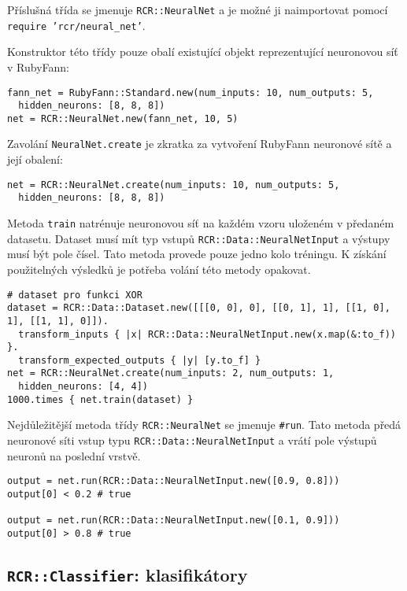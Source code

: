 \documentclass[a4paper]{article}
\begin{document}
Příslušná třída se jmenuje \texttt{RCR::NeuralNet} a je možné ji naimportovat
pomocí \texttt{require 'rcr/neural\_net'}.

Konstruktor této třídy pouze obalí existující objekt reprezentující neuronovou
síť v RubyFann:
\begin{lstlisting}
fann_net = RubyFann::Standard.new(num_inputs: 10, num_outputs: 5,
  hidden_neurons: [8, 8, 8])
net = RCR::NeuralNet.new(fann_net, 10, 5)
\end{lstlisting}

Zavolání \texttt{NeuralNet.create} je zkratka za vytvoření RubyFann neuronové
sítě a její obalení:
\begin{lstlisting}
net = RCR::NeuralNet.create(num_inputs: 10, num_outputs: 5,
  hidden_neurons: [8, 8, 8])
\end{lstlisting}

Metoda \texttt{train} natrénuje neuronovou síť na každém vzoru uloženém
v předaném datasetu. Dataset musí mít typ vstupů \texttt{RCR::Data::NeuralNetInput} a
výstupy musí být pole čísel. Tato metoda provede pouze jedno kolo tréningu.
K získání použitelných výsledků je potřeba volání této metody opakovat.
\begin{lstlisting}
# dataset pro funkci XOR
dataset = RCR::Data::Dataset.new([[[0, 0], 0], [[0, 1], 1], [[1, 0], 1], [[1, 1], 0]]).
  transform_inputs { |x| RCR::Data::NeuralNetInput.new(x.map(&:to_f)) }.
  transform_expected_outputs { |y| [y.to_f] }
net = RCR::NeuralNet.create(num_inputs: 2, num_outputs: 1,
  hidden_neurons: [4, 4])
1000.times { net.train(dataset) }
\end{lstlisting}

Nejdůležitější metoda třídy \texttt{RCR::NeuralNet} se jmenuje \texttt{\#run}.
Tato metoda předá neuronové síti vstup typu \texttt{RCR::Data::NeuralNetInput} a
vrátí pole výstupů neuronů na poslední vrstvě.
\begin{lstlisting}
output = net.run(RCR::Data::NeuralNetInput.new([0.9, 0.8]))
output[0] < 0.2 # true

output = net.run(RCR::Data::NeuralNetInput.new([0.1, 0.9]))
output[0] > 0.8 # true
\end{lstlisting}



\subsection{\texttt{RCR::Classifier}: klasifikátory}
\end{document}
